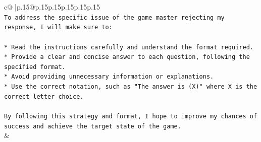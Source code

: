 \documentclass{article}
\begin{document}
{\begin{supertabular}{c@{$\;$}|p{.15\linewidth}@{}p{.15\linewidth}p{.15\linewidth}p{.15\linewidth}p{.15\linewidth}p{.15\linewidth}}
{{{\\ 
\texttt{To address the specific issue of the game master rejecting my response, I will make sure to:} \\
\\ 
\texttt{*   Read the instructions carefully and understand the format required.} \\
\texttt{*   Provide a clear and concise answer to each question, following the specified format.} \\
\texttt{*   Avoid providing unnecessary information or explanations.} \\
\texttt{*   Use the correct notation, such as "The answer is (X)" where X is the correct letter choice.} \\
\\ 
\texttt{By following this strategy and format, I hope to improve my chances of success and achieve the target state of the game.} \\
            }
        }
    }
    & \\ \\

\end{supertabular}
}
\end{document}

